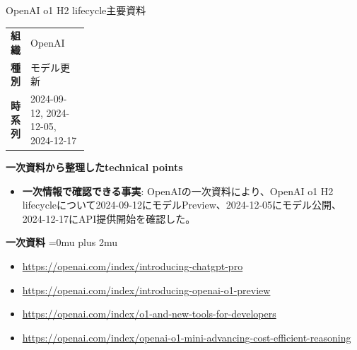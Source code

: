 \begin{technicalnote}{OpenAI o1 H2 lifecycle}{主要資料}
\begingroup
\begin{tabularx}{\linewidth}{@{}>{\bfseries}p{0.22\linewidth}X@{}}
組織 & OpenAI \\
種別 & モデル更新 \\
時系列 & 2024-09-12, 2024-12-05, 2024-12-17 \\
\end{tabularx}
\smallskip
{\bfseries 一次資料から整理したtechnical points}
\begin{itemize}[leftmargin=1.5em,itemsep=0.35em]
\item \textbf{一次情報で確認できる事実}: OpenAIの一次資料により、OpenAI o1 H2 lifecycleについて2024-09-12にモデルPreview、2024-12-05にモデル公開、2024-12-17にAPI提供開始を確認した。
\end{itemize}
\begin{minipage}{\linewidth}
\begin{samepage}
{\bfseries 一次資料}
\begingroup\sloppy
\Urlmuskip=0mu plus 2mu\relax
\begin{itemize}[leftmargin=1.5em,itemsep=0.25em]
\item {\scriptsize\url{https://openai.com/index/introducing-chatgpt-pro}}
\item {\scriptsize\url{https://openai.com/index/introducing-openai-o1-preview}}
\item {\scriptsize\url{https://openai.com/index/o1-and-new-tools-for-developers}}
\item {\scriptsize\url{https://openai.com/index/openai-o1-mini-advancing-cost-efficient-reasoning}}
\end{itemize}
\endgroup
\end{samepage}
\end{minipage}
\endgroup
\end{technicalnote}
\medskip

